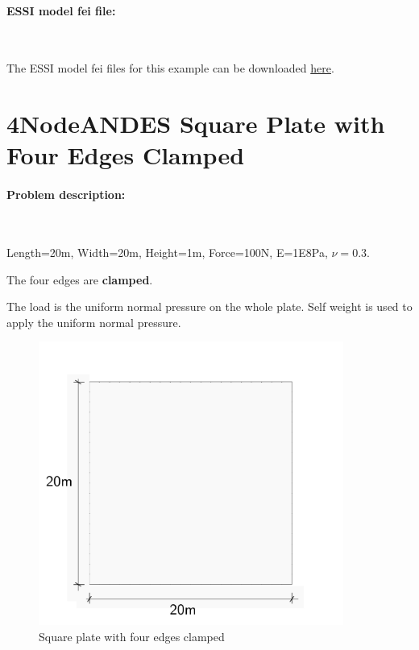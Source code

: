 \documentclass[fleqn,11pt]{article}
\begin{document}
\paragraph{ESSI model fei file: } ~




The ESSI model fei files for this example can be downloaded \href{https://github.com/yuan-energy/Real-ESSI-Examples/blob/master/model_fei_file/27NodeBrick_dynamic_impose_motion/27NodeBrick_dynamic_impose_motion.tgz?raw=true}{here}.











\newpage
\section{4NodeANDES Square Plate with Four Edges Clamped}



\paragraph{Problem description:} ~



Length=20m, Width=20m, Height=1m, Force=100N, E=1E8Pa, $\nu=0.3$. 

The four edges are \textbf{clamped}. 

The load is the uniform normal pressure on the whole plate. Self weight is used to apply the uniform normal pressure. 


\begin{figure}[H]
  \centering
  \includegraphics[width=10cm]{../Figure-files/square_plate_descrp.pdf}
  \caption{Square plate with four edges clamped }
  \label{fig 4NodeANDES edges clamped square plate with element side length for program description }
\end{figure}
\end{document}
